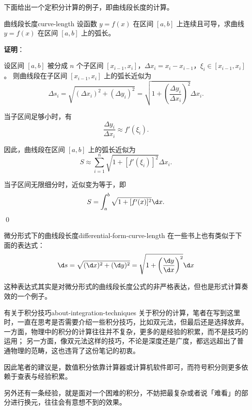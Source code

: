 下面给出一个定积分计算的例子，即曲线段长度的计算。
\begin{example}{曲线段长度}{curve-length}
    设函数 $ y = f(x) $ 在区间 $ [a, b] $ 上连续且可导，求曲线 $ y = f(x) $ 在区间 $ [a, b] $ 上的弧长。

    \textbf{证明}：

    设区间 $ [a, b] $ 被分成 $ n $ 个子区间 $ [x_{i-1}, x_i] $，$ \Delta x_i = x_i - x_{i-1} $，$ \xi_i \in [x_{i-1}, x_i] $。
    则曲线段在子区间 $ [x_{i-1}, x_i] $ 上的弧长近似为
    \begin{equation*}
        \Delta s_i = \sqrt{(\Delta x_i)^2 + (\Delta y_i)^2} = \sqrt{1 + \left( \frac{\Delta y_i}{\Delta x_i} \right)^2} \Delta x_i.
    \end{equation*}

    当子区间足够小时，有
    \begin{equation*}
        \frac{\Delta y_i}{\Delta x_i} \approx f'(\xi_i).
    \end{equation*}

    因此，曲线段在区间 $ [a, b] $ 上的弧长近似为
    \begin{equation*}
        S \approx \sum_{i=1}^n \sqrt{1 + [f'(\xi_i)]^2} \Delta x_i.
    \end{equation*}

    当子区间无限细分时，近似变为等于，即
    \begin{equation*}
        S = \int_a^b \sqrt{1 + [f'(x)]^2} \d x.
    \end{equation*}
    \qed
\end{example}

\begin{note}{微分形式下的曲线段长度}{differential-form-curve-length}
    在一些书上也有类似于下面的表达式：
    \begin{equation*}
        \d s = \sqrt {(\d x)^2 + (\d y)^2} = \sqrt {1 + \left( \frac{\d y}{\d x} \right)^2} \d x
    \end{equation*}

    这种表达式其实是对微分形式的曲线段长度公式的非严格表达，但也是形式计算奏效的一个例子。
\end{note}

\begin{note}{有关于积分技巧}{about-integration-techniques}
    关于积分的计算，笔者在写到这里时，一直在思考是否需要介绍一些积分技巧，比如双元法，但最后还是选择放弃。
    一方面，物理中的积分的计算往往并不复杂，更多的是经验的积累，而不是技巧的运用；
    另一方面，像双元法这样的技巧，不论是深度还是广度，都远远超出了普通物理的范畴，这也违背了这份笔记的初衷。

    因此笔者的建议是，数值积分依靠计算器或计算机软件即可，而符号积分则更多依赖于查表与经验积累。

    另外还有一条经验，就是面对一个困难的积分，不妨把最复杂或者说「难看」的部分进行换元，往往会有意想不到的效果。
\end{note}


